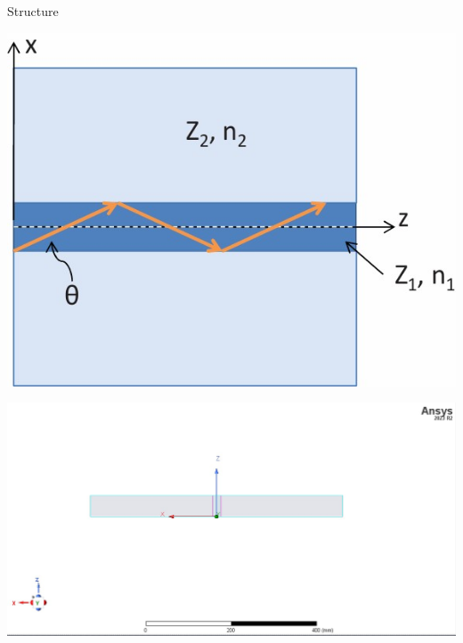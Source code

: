\documentclass{beamer}
\begin{document}
\begin{frame}{Structure}
    \begin{minipage}{0.48\textwidth}
        \centering
            \includegraphics[width=\textwidth]{2.jpg}
        \end{minipage}
        \hfill
        \begin{minipage}{0.48\textwidth}
        \centering
            \includegraphics[width=\textwidth]{Top.jpg}
        \end{minipage}
\end{frame}
\end{document}
